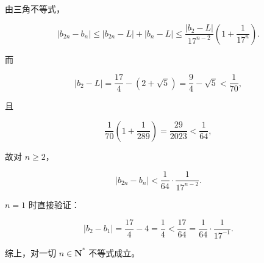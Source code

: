 \begin{answer}
由三角不等式，

\nopagebreak[4]
\[|b_{2n}-b_n|\leqslant|b_{2n}-L|+|b_n-L|
\leqslant\frac{|b_2-L|}{17^{n-2}}\left(1+\frac1{17^n}\right).\]

而

\nopagebreak[4]
\[|b_2-L|=\frac{17}4-(2+\sqrt5)=\frac94-\sqrt5<\frac1{70},\]

且

\nopagebreak[4]
\[\frac1{70}\left(1+\frac1{289}\right)=\frac{29}{2023}<\frac1{64},\]

故对 $n\geqslant2$，

\nopagebreak[4]
\[|b_{2n}-b_n|<\frac1{64}\cdot\frac1{17^{n-2}}.\]

$n=1$ 时直接验证：

\nopagebreak[4]
\[|b_2-b_1|=\frac{17}4-4=\frac14<\frac{17}{64}=\frac1{64}\cdot\frac1{17^{-1}}.\]

综上，对一切 $n\in\mathbf N^*$ 不等式成立。


\end{answer}